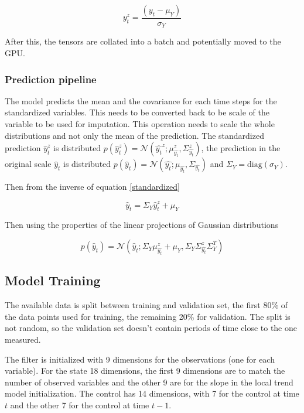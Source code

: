 \documentclass{article}
\newcommand{\norm}[3]{\mathcal{N}\left(#1; #2, #3\right)} %
\let\Oldsubsection\subsection
\renewcommand{\subsection}{\FloatBarrier\Oldsubsection}
\begin{document}
\begin{equation}\label{standardized}
    y^z_t = \frac{(y_t - \mu_Y)}{\sigma_Y}
\end{equation}

After this, the tensors are collated into a batch and potentially moved to the GPU.

\subsubsection{Prediction pipeline}

The model predicts the mean and the covariance for each time steps for the standardized variables. This needs to be converted back to be scale of the variable to be used for imputation. This operation needs to scale the whole distributions and not only the mean of the prediction. The standardized prediction $\hat{y}^z_t$ is distributed $p(\hat{y}^z_t) = \norm{\hat{y_t}^z}{\mu^z_{\hat{y_t}}}{\Sigma^z_{\hat{y_t}}}$, the prediction in the original scale $\hat{y}_t$ is distributed $p(\hat{y}_t) =  \norm{\hat{y_t}}{\mu_{\hat{y_t}}}{\Sigma_{\hat{y_t}}}$ and $\Sigma_Y = \text{diag}(\sigma_Y)$. 

Then from the inverse of equation \ref{standardized}

\begin{equation}
    \hat{y}_t = \Sigma_Y\hat{y}^z_t + \mu_Y
\end{equation}

Then using the properties of the linear projections of Gaussian distributions

\begin{equation}
    p(\hat{y}_t) = \norm{\hat{y}_t}{\Sigma_Y\mu^z_{\hat{y_t}} + \mu_Y}{\Sigma_Y\Sigma^z_{\hat{y_t}}\Sigma_Y^T}
\end{equation}

\subsection{Model Training}

The available data is split between training and validation set, the first 80\% of the data points used for training, the remaining 20\% for validation. The split is not random, so the validation set doesn't contain periods of time close to the one measured.

The filter is initialized with 9 dimensions for the observations (one for each variable). For the state 18 dimensions, the first 9 dimensions are to match the number of observed variables and the other 9 are for the slope in the local trend model initialization. The control has 14 dimensions, with 7 for the control at time $t$ and the other 7 for the control at time $t-1$.
\end{document}
